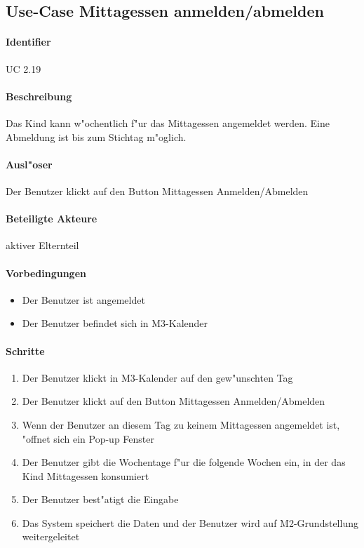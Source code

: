   
  \newpage
 \subsection{Use-Case Mittagessen anmelden/abmelden}
  \paragraph{Identifier}
  UC 2.19
  \paragraph{Beschreibung}
  Das Kind kann w"ochentlich f"ur das Mittagessen angemeldet werden. Eine Abmeldung ist bis zum Stichtag m"oglich.
  \paragraph{Ausl"oser}
  Der Benutzer klickt auf den Button Mittagessen Anmelden/Abmelden
  \paragraph{Beteiligte Akteure}   \leavevmode \newline
    aktiver Elternteil
  \paragraph{Vorbedingungen}
  \begin{itemize}
   \item Der Benutzer ist angemeldet
   \item Der Benutzer befindet sich in M3-Kalender
  \end{itemize}

  \paragraph{Schritte}
  \begin{enumerate}
   \item Der Benutzer klickt in M3-Kalender auf den gew"unschten Tag
   \item Der Benutzer klickt auf den Button \dq Mittagessen Anmelden/Abmelden\dq
   \item Wenn der Benutzer an diesem Tag zu keinem Mittagessen angemeldet ist, "offnet sich ein Pop-up Fenster
   \item Der Benutzer gibt die Wochentage f"ur die folgende Wochen ein, in der das Kind Mittagessen konsumiert
   \item Der Benutzer best"atigt die Eingabe
   \item Das System speichert die Daten und der Benutzer wird auf M2-Grundstellung weitergeleitet
  \end{enumerate}

